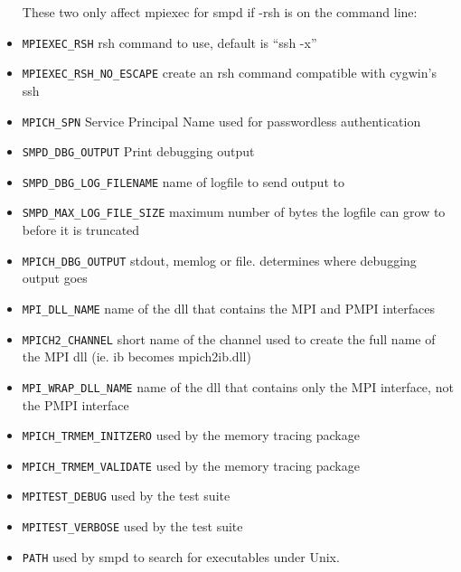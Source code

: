 \documentclass[dvipdfm,11pt]{article}
\begin{document}
\begin{itemize}
These two only affect mpiexec for smpd if -rsh is on the command line:
\item \texttt{MPIEXEC\_RSH}
rsh command to use, default is ``ssh -x''
\item \texttt{MPIEXEC\_RSH\_NO\_ESCAPE}
create an rsh command compatible with cygwin's ssh
\item \texttt{MPICH\_SPN}
Service Principal Name used for passwordless authentication
\item \texttt{SMPD\_DBG\_OUTPUT}
Print debugging output
\item \texttt{SMPD\_DBG\_LOG\_FILENAME}
name of logfile to send output to
\item \texttt{SMPD\_MAX\_LOG\_FILE\_SIZE}
maximum number of bytes the logfile can grow to before it is truncated
\item \texttt{MPICH\_DBG\_OUTPUT}
stdout, memlog or file.  determines where debugging output goes
\item \texttt{MPI\_DLL\_NAME}
name of the dll that contains the MPI and PMPI interfaces
\item \texttt{MPICH2\_CHANNEL}
short name of the channel used to create the full name of the MPI dll (ie. ib becomes mpich2ib.dll)
\item \texttt{MPI\_WRAP\_DLL\_NAME}
name of the dll that contains only the MPI interface, not the PMPI interface
\item \texttt{MPICH\_TRMEM\_INITZERO}
used by the memory tracing package
\item \texttt{MPICH\_TRMEM\_VALIDATE}
used by the memory tracing package
\item \texttt{MPITEST\_DEBUG}
used by the test suite
\item \texttt{MPITEST\_VERBOSE}
used by the test suite
\item \texttt{PATH}
used by smpd to search for executables under Unix.
\end{itemize}
\end{document}
